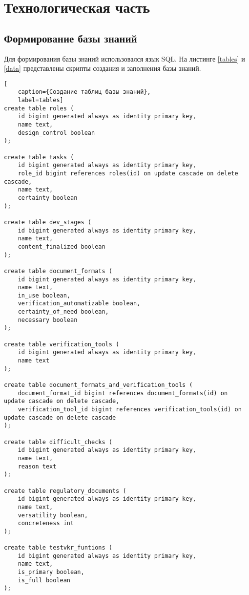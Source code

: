 \chapter{Технологическая часть}

\section{Формирование базы знаний}

Для формирования базы знаний использовался язык SQL. На листинге \ref{tables} и \ref{data} представлены скрипты создания и заполнения базы знаний.

\begin{lstlisting}[
	caption={Создание таблиц базы знаний},
	label=tables]
create table roles (
	id bigint generated always as identity primary key,
	name text,
	design_control boolean
);

create table tasks (
	id bigint generated always as identity primary key,
	role_id bigint references roles(id) on update cascade on delete cascade,
	name text,
	certainty boolean
);

create table dev_stages (
	id bigint generated always as identity primary key,
	name text,
	content_finalized boolean
);

create table document_formats (
	id bigint generated always as identity primary key,
	name text,
	in_use boolean,
	verification_automatizable boolean,
	certainty_of_need boolean,
	necessary boolean
);

create table verification_tools (
	id bigint generated always as identity primary key,
	name text
);

create table document_formats_and_verification_tools (
	document_format_id bigint references document_formats(id) on update cascade on delete cascade,
	verification_tool_id bigint references verification_tools(id) on update cascade on delete cascade
);

create table difficult_checks (
	id bigint generated always as identity primary key,
	name text,
	reason text
);

create table regulatory_documents (
	id bigint generated always as identity primary key,
	name text,
	versatility boolean,
	concreteness int
);

create table testvkr_funtions (
	id bigint generated always as identity primary key,
	name text,
	is_primary boolean,
	is_full boolean
);
\end{lstlisting}

